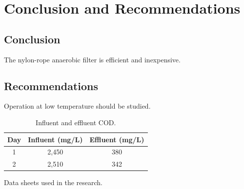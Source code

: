\documentclass[english]{kuthesis}
\begin{document}
\chapter{Conclusion and Recommendations}
\section{Conclusion}
The nylon-rope anaerobic filter is efficient and inexpensive.
\section{Recommendations}
Operation at low temperature should be studied.

\printbibliography

\appendix
{}

\begin{table}[htbp]
  \caption{Influent and effluent COD.}
  \centering
  \begin{tabular}{ccc}
    \toprule
    Day & Influent (mg/L) & Effluent (mg/L) \\
    \midrule
    1 & 2,450 & 380 \\
    2 & 2,510 & 342 \\
    \bottomrule
  \end{tabular}
\end{table}


Data sheets used in the research.

\begin{vitae}
\end{vitae}
\end{document}

